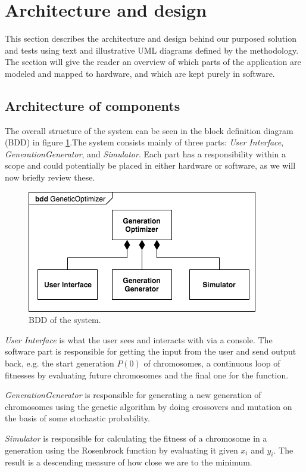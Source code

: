 \section{Architecture and design}\label{sec:archdesign}

This section describes the architecture and design behind our purposed solution and tests using text and illustrative UML diagrams defined by the methodology. The section will give the reader an overview of which parts of the application are modeled and mapped to hardware, and which are kept purely in software.

\subsection{Architecture of components}

The overall structure of the system can be seen in the block definition diagram (BDD) in figure \ref{fig:bdd}.The system consists mainly of three parts: \emph{User Interface}, \emph{GenerationGenerator}, and \emph{Simulator}. Each part has a responsibility within a scope and could potentially be placed in either hardware or software, as we will now briefly review these.

\begin{figure}[h!]
	\centering
	\includegraphics[width=0.6\linewidth]{../diagrams/bdd.png}
	\caption{BDD of the system.}
	\label{fig:bdd}
\end{figure}

\emph{User Interface} is what the user sees and interacts with via a console. The software part is responsible for getting the input from the user and send output back, e.g. the start generation $P(0)$ of chromosomes, a continuous loop of fitnesses by evaluating future chromosomes and the final one for the function.

\emph{GenerationGenerator} is responsible for generating a new generation of chromosomes using the genetic algorithm by doing crossovers and mutation on the basis of some stochastic probability.

\emph{Simulator} is responsible for calculating the fitness of a chromosome in a generation using the Rosenbrock function by evaluating it given $x_{i}$ and $y_{i}$. The result is a descending measure of how close we are to the minimum.

